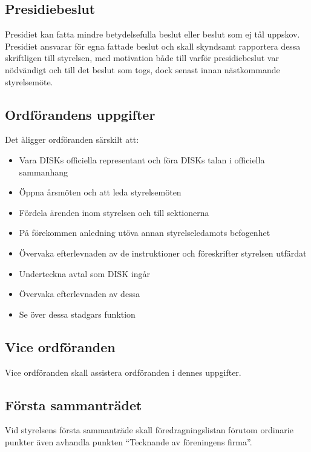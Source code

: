         \subsection{Presidiebeslut}
        \label{subsec:presidiebeslut}
                Presidiet kan fatta mindre betydelsefulla beslut eller beslut som ej tål uppskov. Presidiet ansvarar för egna fattade beslut och skall skyndsamt rapportera dessa skriftligen till styrelsen, med motivation både till varför presidiebeslut var nödvändigt och till det beslut som togs, dock senast innan nästkommande styrelsemöte.

        \subsection{Ordförandens uppgifter}
        \label{subsec:ordforandensuppgifter}
                Det åligger ordföranden särskilt att:
                \begin{itemize}
                \setlength{\itemsep}{0.0cm}
                \setlength{\parskip}{0.0cm}
                        \item Vara DISKs officiella representant och föra DISKs talan i officiella sammanhang
                        \item Öppna årsmöten och att leda styrelsemöten
                        \item Fördela ärenden inom styrelsen och till sektionerna
                        \item På förekommen anledning utöva annan styrelseledamots befogenhet
                        \item Övervaka efterlevnaden av de instruktioner och föreskrifter styrelsen utfärdat
                        \item Underteckna avtal som DISK ingår
                        \item Övervaka efterlevnaden av dessa
                        \item Se över dessa stadgars funktion
                \end{itemize}

        \subsection{Vice ordföranden}
        \label{subsec:viceordforanden}
                Vice ordföranden skall assistera ordföranden i dennes uppgifter.

        \subsection{Första sammanträdet}
        \label{subsec:forstasammantradet}
                Vid styrelsens första sammanträde skall föredragningslistan förutom ordinarie punkter även avhandla punkten ``Tecknande av föreningens firma''.

